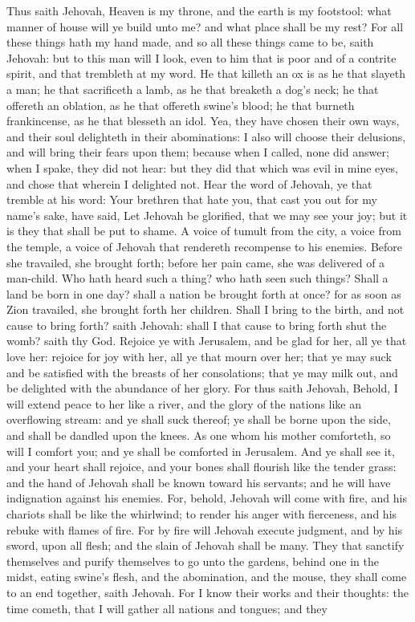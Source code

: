 Thus saith Jehovah, Heaven is my throne, and the earth is my footstool: what manner of house will ye build unto me? and what place shall be my rest? For all these things hath my hand made, and so all these things came to be, saith Jehovah: but to this man will I look, even to him that is poor and of a contrite spirit, and that trembleth at my word. He that killeth an ox is as he that slayeth a man; he that sacrificeth a lamb, as he that breaketh a dog’s neck; he that offereth an oblation, as he that offereth swine’s blood; he that burneth frankincense, as he that blesseth an idol. Yea, they have chosen their own ways, and their soul delighteth in their abominations: I also will choose their delusions, and will bring their fears upon them; because when I called, none did answer; when I spake, they did not hear: but they did that which was evil in mine eyes, and chose that wherein I delighted not.  Hear the word of Jehovah, ye that tremble at his word: Your brethren that hate you, that cast you out for my name’s sake, have said, Let Jehovah be glorified, that we may see your joy; but it is they that shall be put to shame. A voice of tumult from the city, a voice from the temple, a voice of Jehovah that rendereth recompense to his enemies.  Before she travailed, she brought forth; before her pain came, she was delivered of a man-child. Who hath heard such a thing? who hath seen such things? Shall a land be born in one day? shall a nation be brought forth at once? for as soon as Zion travailed, she brought forth her children. Shall I bring to the birth, and not cause to bring forth? saith Jehovah: shall I that cause to bring forth shut the womb? saith thy God.  Rejoice ye with Jerusalem, and be glad for her, all ye that love her: rejoice for joy with her, all ye that mourn over her; that ye may suck and be satisfied with the breasts of her consolations; that ye may milk out, and be delighted with the abundance of her glory. For thus saith Jehovah, Behold, I will extend peace to her like a river, and the glory of the nations like an overflowing stream: and ye shall suck thereof; ye shall be borne upon the side, and shall be dandled upon the knees. As one whom his mother comforteth, so will I comfort you; and ye shall be comforted in Jerusalem. And ye shall see it, and your heart shall rejoice, and your bones shall flourish like the tender grass: and the hand of Jehovah shall be known toward his servants; and he will have indignation against his enemies.  For, behold, Jehovah will come with fire, and his chariots shall be like the whirlwind; to render his anger with fierceness, and his rebuke with flames of fire. For by fire will Jehovah execute judgment, and by his sword, upon all flesh; and the slain of Jehovah shall be many. They that sanctify themselves and purify themselves to go unto the gardens, behind one in the midst, eating swine’s flesh, and the abomination, and the mouse, they shall come to an end together, saith Jehovah.  For I know their works and their thoughts: the time cometh, that I will gather all nations and tongues; and they 